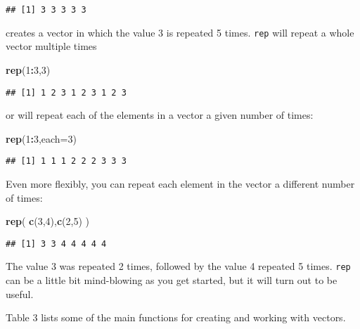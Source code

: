 \documentclass[11pt,]{article}
\newenvironment{Shaded}{\begin{snugshade}}{\end{snugshade}}
\newcommand{\KeywordTok}[1]{\textcolor[rgb]{0.13,0.29,0.53}{\textbf{#1}}}
\newcommand{\DataTypeTok}[1]{\textcolor[rgb]{0.13,0.29,0.53}{#1}}
\newcommand{\DecValTok}[1]{\textcolor[rgb]{0.00,0.00,0.81}{#1}}
\newcommand{\OperatorTok}[1]{\textcolor[rgb]{0.81,0.36,0.00}{\textbf{#1}}}
\newcommand{\NormalTok}[1]{#1}
\begin{document}
\begin{verbatim}
## [1] 3 3 3 3 3
\end{verbatim}

creates a vector in which the value 3 is repeated 5 times. \texttt{rep}
will repeat a whole vector multiple times

\begin{Shaded}
\begin{Highlighting}[]
\KeywordTok{rep}\NormalTok{(}\DecValTok{1}\OperatorTok{:}\DecValTok{3}\NormalTok{,}\DecValTok{3}\NormalTok{)}
\end{Highlighting}
\end{Shaded}

\begin{verbatim}
## [1] 1 2 3 1 2 3 1 2 3
\end{verbatim}

or will repeat each of the elements in a vector a given number of times:

\begin{Shaded}
\begin{Highlighting}[]
\KeywordTok{rep}\NormalTok{(}\DecValTok{1}\OperatorTok{:}\DecValTok{3}\NormalTok{,}\DataTypeTok{each=}\DecValTok{3}\NormalTok{)}
\end{Highlighting}
\end{Shaded}

\begin{verbatim}
## [1] 1 1 1 2 2 2 3 3 3
\end{verbatim}

Even more flexibly, you can repeat each element in the vector a
different number of times:

\begin{Shaded}
\begin{Highlighting}[]
\KeywordTok{rep}\NormalTok{( }\KeywordTok{c}\NormalTok{(}\DecValTok{3}\NormalTok{,}\DecValTok{4}\NormalTok{),}\KeywordTok{c}\NormalTok{(}\DecValTok{2}\NormalTok{,}\DecValTok{5}\NormalTok{) )}
\end{Highlighting}
\end{Shaded}

\begin{verbatim}
## [1] 3 3 4 4 4 4 4
\end{verbatim}

The value 3 was repeated 2 times, followed by the value 4 repeated 5
times. \texttt{rep} can be a little bit mind-blowing as you get started,
but it will turn out to be useful.

Table 3 lists some of the main functions for creating and working with
vectors.
\end{document}
